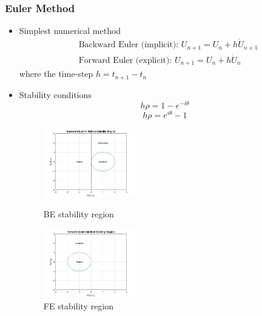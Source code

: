 \documentclass[xcolor=svgnames,9pt]{beamer}
\theoremstyle{remark}
\begin{document}
		\begin{frame}
  			\frametitle{Euler Method}
			\begin{itemize}
				\item Simplest numerical method
				\begin{align}\label{Euler}
					&\text{Backward Euler (implicit):  }U_{n+1} = U_n + h\dot{U}_{n+1}\\
					&\text{Forward Euler (explicit):  }U_{n+1} = U_n + h\dot{U}_{n}
				\end{align} where the time-step $h = t_{n+1}-t_n$
				\item Stability conditions
					\begin{equation}
						 h\rho = 1 - e^{-i\theta}
					\end{equation}
					\begin{equation}
						 h\rho = e^{i\theta} - 1
					\end{equation}
				\begin{figure}
 				 	\begin{minipage}[b]{0.4\textwidth}
						\centering
    						\includegraphics[width=40mm]{GraphEulerB.jpg}
    						\caption{BE stability region}
						\label{Springs2}
  					\end{minipage}
 					\hfill
					\begin{minipage}[b]{0.4\textwidth}
						\centering
 				  		\includegraphics[width=40mm]{GraphEulerF.jpg}
    						\caption{FE stability region}
						\label{Springs3}
 					\end{minipage}
				\end{figure}
			\end{itemize}
		\end{frame}
\end{document}
